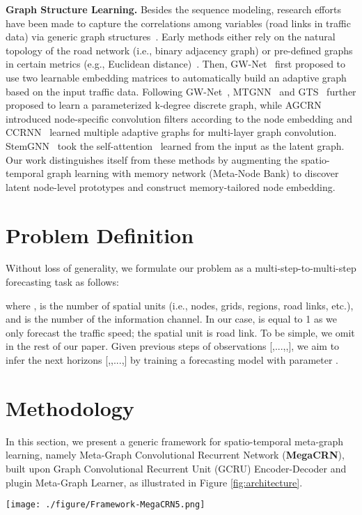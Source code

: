 \documentclass[letterpaper]{article} \usepackage{aaai23}  \usepackage{times}  \usepackage{helvet}  \usepackage{courier}  \usepackage[hyphens]{url}  \usepackage{graphicx} \urlstyle{rm} \def\UrlFont{\rm}  \usepackage{natbib}  \usepackage{caption} \usepackage{multirow}
\begin{document}
\noindent\textbf{Graph Structure Learning.} Besides the sequence modeling, research efforts have been made to capture the correlations among variables (road links in traffic data) via generic graph structures~\cite{kipf2018neural}.
Early methods either rely on the natural topology of the road network (i.e., binary adjacency graph) or pre-defined graphs in certain metrics (e.g., Euclidean distance)~\cite{li2018diffusion,yu2018spatio}. Then, GW-Net~\cite{wu2019graph} first proposed to use two learnable embedding matrices to automatically build an adaptive graph based on the input traffic data. Following GW-Net~\cite{wu2019graph}, MTGNN~\cite{wu2020connecting} and GTS~\cite{shang2021discrete} further proposed to learn a parameterized k-degree discrete graph, while AGCRN~\cite{bai2020adaptive} introduced node-specific convolution filters according to the node embedding and CCRNN~\cite{ye2021coupled} learned multiple adaptive graphs for multi-layer graph convolution. StemGNN~\cite{cao2020spectral} took the self-attention~\cite{vaswani2017attention} learned from the input as the latent graph. Our work distinguishes itself from these methods by augmenting the spatio-temporal graph learning with memory network (Meta-Node Bank) to discover latent node-level prototypes and construct memory-tailored node embedding.





\section{Problem Definition}
Without loss of generality, we formulate our problem as a multi-step-to-multi-step forecasting task as follows: 

where   ,  is the number of spatial units (i.e., nodes, grids, regions, road links, etc.), and  is the number of the information channel. In our case,  is equal to 1 as we only forecast the traffic speed; the spatial unit is road link. To be simple, we omit  in the rest of our paper. Given previous  steps of observations [,...,,], 
we aim to infer the next  horizons [,,...,] by training a forecasting model  with parameter . 


\section{Methodology}
In this section, we present a generic framework for spatio-temporal meta-graph learning, namely Meta-Graph Convolutional Recurrent Network (\textbf{MegaCRN}), built upon Graph Convolutional Recurrent Unit (GCRU) Encoder-Decoder and plugin Meta-Graph Learner, as illustrated in Figure \ref{fig:architecture}.
\begin{figure*}[h]
	\centering
	\texttt{[image: ./figure/Framework-MegaCRN5.png]}
	\caption{Framework of \textbf{\underline{Me}}ta-\textbf{\underline{G}}r\textbf{\underline{a}}ph \underline{\textbf{C}}onvolutional \textbf{\underline{R}}ecurrent \textbf{\underline{N}}etwork (\textbf{MegaCRN})}
	\label{fig:architecture}
\end{figure*}
\end{document}
